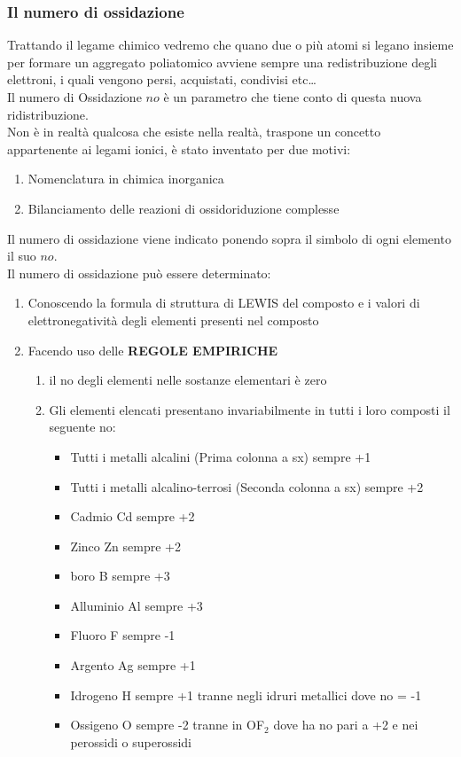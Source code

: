 \documentclass{article}
\begin{document}
\subsubsection{Il numero di ossidazione}
Trattando il legame chimico vedremo che quano due o più atomi si legano insieme per formare un aggregato
poliatomico avviene sempre una redistribuzione degli elettroni, i quali vengono persi, acquistati, condivisi etc\dots \\
Il numero di Ossidazione $no$ è un parametro che tiene conto di questa nuova ridistribuzione.\\
Non è in realtà qualcosa che esiste nella realtà, traspone un concetto appartenente ai legami ionici, è stato inventato per due motivi:
\begin{enumerate}
    \item Nomenclatura in chimica inorganica
    \item Bilanciamento delle reazioni di ossidoriduzione complesse
\end{enumerate}
Il numero di ossidazione viene indicato ponendo sopra il simbolo di ogni elemento il suo $no$.\\
Il numero di ossidazione può essere determinato:
\begin{enumerate}
    \item Conoscendo la formula di struttura di LEWIS del composto e i valori di elettronegatività degli elementi presenti nel composto
    \item Facendo uso delle \textbf{REGOLE EMPIRICHE}
    \begin{enumerate}
        \item il no degli elementi nelle sostanze elementari è zero
        \item Gli elementi elencati presentano invariabilmente in tutti i loro composti il seguente no:
        \begin{itemize}
            \item Tutti i metalli alcalini (Prima colonna a sx) sempre +1
            \item Tutti i metalli alcalino-terrosi (Seconda colonna a sx) sempre +2
            \item Cadmio Cd sempre +2
            \item Zinco Zn sempre +2
            \item boro B sempre +3
            \item Alluminio Al sempre +3
            \item Fluoro F sempre -1
            \item Argento Ag sempre +1
            \item Idrogeno H sempre +1 tranne negli idruri metallici dove no = -1
            \item Ossigeno O sempre -2 tranne in OF$_2$ dove ha no pari a +2 e nei perossidi o superossidi
        \end{itemize}
    \end{enumerate}
\end{enumerate}
\end{document}

